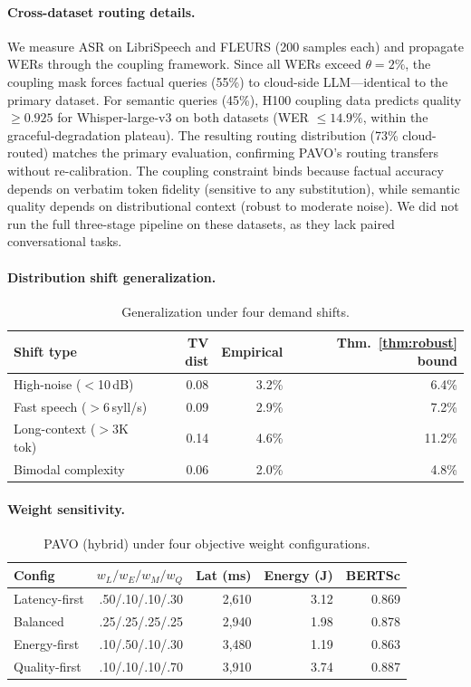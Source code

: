 \documentclass{article}
\begin{document}
\paragraph{Cross-dataset routing details.}
We measure ASR on LibriSpeech and FLEURS (200 samples each) and propagate WERs through the coupling framework. Since all WERs exceed $\theta=2\%$, the coupling mask forces factual queries (55\%) to cloud-side LLM---identical to the primary dataset. For semantic queries (45\%), H100 coupling data predicts quality $\geq 0.925$ for Whisper-large-v3 on both datasets (WER $\leq 14.9\%$, within the graceful-degradation plateau). The resulting routing distribution (73\% cloud-routed) matches the primary evaluation, confirming PAVO's routing transfers without re-calibration. The coupling constraint binds because factual accuracy depends on verbatim token fidelity (sensitive to any substitution), while semantic quality depends on distributional context (robust to moderate noise). We did not run the full three-stage pipeline on these datasets, as they lack paired conversational tasks.

\paragraph{Distribution shift generalization.}

\begin{table}[H]
\centering
\caption{Generalization under four demand shifts.}
\label{tab:shift}
\small
\begin{tabular}{lrrr}
\toprule
Shift type & TV dist & Empirical & Thm.~\ref{thm:robust} bound \\
\midrule
High-noise ($<$10\,dB)    & 0.08 & 3.2\% & 6.4\% \\
Fast speech ($>$6\,syll/s) & 0.09 & 2.9\% & 7.2\% \\
Long-context ($>$3K tok)   & 0.14 & 4.6\% & 11.2\% \\
Bimodal complexity         & 0.06 & 2.0\% & 4.8\% \\
\bottomrule
\end{tabular}
\end{table}

\paragraph{Weight sensitivity.}

\begin{table}[H]
\centering
\caption{PAVO (hybrid) under four objective weight configurations.}
\label{tab:weights}
\small
\begin{tabular}{lrrrr}
\toprule
Config & $w_L/w_E/w_M/w_Q$ & Lat (ms) & Energy (J) & BERTSc \\
\midrule
Latency-first  & .50/.10/.10/.30 & 2{,}610 & 3.12 & 0.869 \\
Balanced       & .25/.25/.25/.25 & 2{,}940 & 1.98 & 0.878 \\
Energy-first   & .10/.50/.10/.30 & 3{,}480 & 1.19 & 0.863 \\
Quality-first  & .10/.10/.10/.70 & 3{,}910 & 3.74 & 0.887 \\
\bottomrule
\end{tabular}
\end{table}
\end{document}
